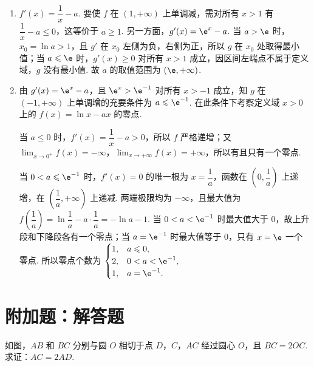 \begin{solution}
\begin{enumerate}
\item \(f'(x)=\dfrac1x-a\). 要使 \(f\) 在 \((1,+\infty)\) 上单调减，需对所有 \(x>1\) 有 \(\dfrac1x-a\leqslant0\)，这等价于 \(a\geqslant1\). 另一方面，\(g'(x)=\e^x-a\). 当 \(a>\e\) 时，\(x_0=\ln a>1\)，且 \(g'\) 在 \(x_0\) 左侧为负，右侧为正，所以 \(g\) 在 \(x_0\) 处取得最小值；当 \(a\leqslant\e\) 时，\(g'(x)\geqslant0\) 对所有 \(x>1\) 成立，因区间左端点不属于定义域，\(g\) 没有最小值. 故 \(a\) 的取值范围为 \((\e,+\infty)\).
\item 由 \(g'(x)=\e^x-a\)，且 \(\e^x>\e^{-1}\) 对所有 \(x>-1\) 成立，知 \(g\) 在 \((-1,+\infty)\) 上单调增的充要条件为 \(a\leqslant\e^{-1}\). 在此条件下考察定义域 \(x>0\) 上的 \(f(x)=\ln x-ax\) 的零点.

当 \(a\leqslant0\) 时，\(f'(x)=\dfrac1x-a>0\)，所以 \(f\) 严格递增；又 \(\displaystyle\lim_{x\to0^+}f(x)=-\infty\)，\(\displaystyle\lim_{x\to+\infty}f(x)=+\infty\)，所以有且只有一个零点.

当 \(0<a\leqslant\e^{-1}\) 时，\(f'(x)=0\) 的唯一根为 \(x=\dfrac1a\)，函数在 \(\left(0,\dfrac1a\right)\) 上递增，在 \(\left(\dfrac1a,+\infty\right)\) 上递减. 两端极限均为 \(-\infty\)，且最大值为
\(f\left(\dfrac1a\right)=\ln\dfrac1a-a\cdot\dfrac1a=-\ln a-1\). 当 \(0<a<\e^{-1}\) 时最大值大于 \(0\)，故上升段和下降段各有一个零点；当 \(a=\e^{-1}\) 时最大值等于 \(0\)，只有 \(x=\e\) 一个零点. 所以零点个数为
\(\begin{cases}
1,&a\leqslant0,\\
2,&0<a<\e^{-1},\\
1,&a=\e^{-1}.
\end{cases}\)
\end{enumerate}
\end{solution}

\section{附加题：解答题}

\begin{problem}[A]
如图，\(AB\) 和 \(BC\) 分别与圆 \(O\) 相切于点 \(D\)，\(C\)，\(AC\) 经过圆心 \(O\)，且 \(BC=2OC\). 求证：\(AC=2AD\).

\end{problem}

